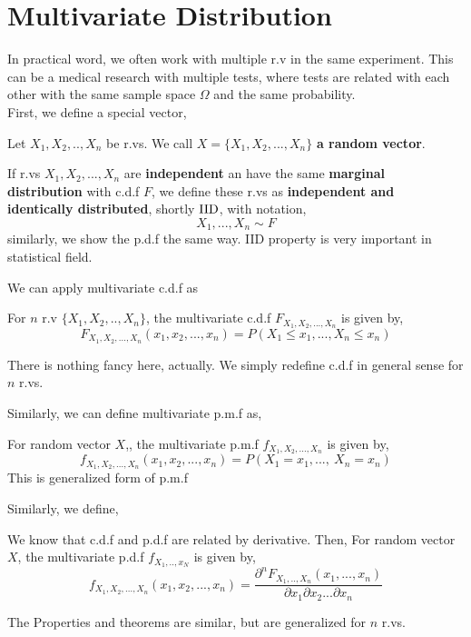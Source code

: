 \section{Multivariate Distribution}
In practical word, we often work with multiple r.v in the same experiment. This can be a medical research with multiple tests, where tests are related with each other with the same sample space $\Omega$ and the same probability.\\
First, we define a special vector,
\begin{definition}
    Let $X_1,X_2,..,X_n$ be r.vs. We call $X = \{ X_1, X_2, ... ,X_n\}$ \textbf{a random vector}.
\end{definition}
\begin{definition}
    If r.vs $X_1,X_2,...,X_n$ are \textbf{independent} an have the same \textbf{marginal distribution} with c.d.f $F$, we define these r.vs as \textbf{independent and identically distributed}, shortly $\operatorname{IID}$, with notation,
    \[X_1,...,X_n \sim F\]
    similarly, we show the p.d.f the same way. IID property is very important in statistical field.
\end{definition}
We can apply multivariate c.d.f as
\begin{definition}
    For $n$  r.v $\{ X_1,X_2,..,X_n \}$, the multivariate c.d.f $F_{X_1,X_2,...,X_n}$ is given by,
    \[F_{X_1,X_2,...,X_n}(x_1,x_2,...,x_n) = P(X_1 \le x_1,...,X_n \le x_n) \]
\end{definition}
There is nothing fancy here, actually. We simply redefine c.d.f in general sense for $n$ r.vs.
\par
Similarly, we can define multivariate p.m.f as,
\begin{definition} For random vector $X$,, the multivariate p.m.f  $f_{X_1,X_2,...,X_n}$ is given by,
    \[ f_{X_1,X_2,...,X_n}(x_1,x_2,...,x_n) = P(X_1=x_1 ,...,  \ X_n = x_n) \]
    This is generalized form of p.m.f

\end{definition}
Similarly, we define,
\begin{definition}
    We know that c.d.f and p.d.f are related by derivative. Then,
    For random vector $X$, the multivariate p.d.f $f_{X_1,..,x_N}$ is given by,
    \[f_{X_1,X_2,...,X_n}(x_1,x_2,...,x_n) = \frac{{\partial}^nF_{X_1,..,X_n}(x_1,...,x_n)}{\partial x_1\partial x_2...\partial x_n}\]
\end{definition}

The Properties and theorems are similar, but are generalized for $n$ r.vs.

